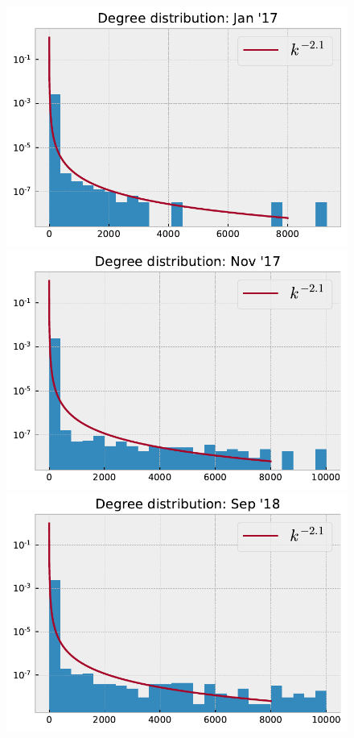 \documentclass[10pt,a4paper]{article}
\begin{document}
\begin{figure}[h]
\centering
\begin{minipage}[t]{.33\textwidth}
\includegraphics[scale=0.4]{figures/degree_dist_jan_17.pdf}
\end{minipage}%
\begin{minipage}[t]{.33\textwidth}
\includegraphics[scale=0.4]{figures/degree_dist_nov_17.pdf}
\end{minipage}
\begin{minipage}[t]{.33\textwidth}
\includegraphics[scale=0.4]{figures/degree_dist_sep_18.pdf}

\end{minipage}
\end{figure}
\end{document}
